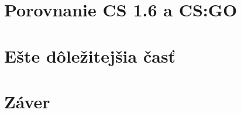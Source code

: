 \documentclass[10pt,twoside,slovak,a4paper]{coursepaper}
\begin{document}
\section{Porovnanie CS 1.6 a CS:GO} \label{porovnanie}




\section{Ešte dôležitejšia časť} \label{dolezitejsia}




\section{Záver} \label{zaver} %


%






\end{document}
